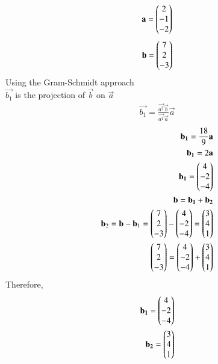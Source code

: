 \documentclass[journal]{IEEEtran}
\begin{document}
\begin{align}
                                     \mathbf{a}= \begin{pmatrix}
                                             2
                                              \\
                                              -1
                                               \\
                                               -2
                                              \end{pmatrix}
\end{align}
\begin{align}
                                     \mathbf{b}= \begin{pmatrix}
                                             7
                                              \\
                                              2
                                               \\
                                               -3
                                              \end{pmatrix}
\end{align}
Using the Gram-Schmidt approach\\
$\vec{{b}_1}$ is the projection of $\vec{b}$ on $\vec{a}$
\begin{align}
  \vec{{b}_1} = \frac{\vec{a^T} \vec{b}}{\vec{a^T} \vec{a}}  \vec{a}
\end{align}
\begin{align}
\mathbf{{b}_1}=\frac{18}{9} \mathbf{a}\\
\mathbf{{b}_1}=2\mathbf{a}\\
\mathbf{{b}_1}= \begin{pmatrix}
                     4
                     \\
                     -2
                      \\
                      -4
                           \end{pmatrix}\\
\mathbf{b}=\mathbf{{b}_1}+\mathbf{{b}_2}\\
\mathbf{b}_2 = \mathbf{b} - \mathbf{b}_1 
= \begin{pmatrix}
7 \\ 2 \\ -3
\end{pmatrix}
-
\begin{pmatrix}
4 \\ -2 \\ -4
\end{pmatrix}
= \begin{pmatrix}
3 \\ 4 \\ 1\end{pmatrix}\\
 \begin{pmatrix}
7 \\ 2 \\ -3
\end{pmatrix}
=
\begin{pmatrix}
4 \\ -2 \\ -4
\end{pmatrix}
+
 \begin{pmatrix}
3 \\ 4 \\ 1\end{pmatrix}
\end{align}
Therefore,
\begin{align}
  \mathbf{{b}_1}=\begin{pmatrix}
4 \\ -2 \\ -4
\end{pmatrix}\\
\mathbf{{b}_2}= \begin{pmatrix}
             3 \\ 4 \\ 1  \end{pmatrix}
\end{align}
\end{document}
